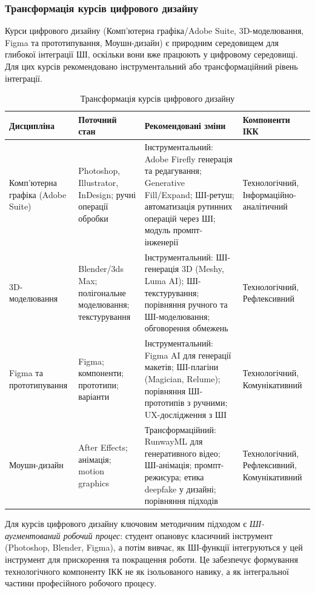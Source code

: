 \subsubsection{Трансформація курсів цифрового дизайну}\label{sssec:3.2.3}

Курси цифрового дизайну (Комп'ютерна графіка/Adobe Suite, 3D-моделювання, Figma та прототипування, Моушн-дизайн) є природним середовищем для глибокої інтеграції ШІ, оскільки вони вже працюють у цифровому середовищі. Для цих курсів рекомендовано інструментальний або трансформаційний рівень інтеграції.

\begin{table}[htbp]
\centering
\caption{Трансформація курсів цифрового дизайну}\label{tab:digital-transform}
\small
\begin{tabularx}{\textwidth}{@{}p{}p{}p{}p{}@{}}
\toprule
\textbf{Дисципліна} & \textbf{Поточний стан} & \textbf{Рекомендовані зміни} & \textbf{Компоненти ІКК} \\
\midrule
Комп'ютерна графіка (Adobe Suite) & Photoshop, Illustrator, InDesign; ручні операції обробки & Інструментальний: Adobe Firefly генерація та редагування; Generative Fill/Expand; ШІ-ретуш; автоматизація рутинних операцій через ШІ; модуль промпт-інженерії & Технологічний, Інформаційно-аналітичний \\
\addlinespace
3D-моделювання & Blender/3ds Max; полігональне моделювання; текстурування & Інструментальний: ШІ-генерація 3D (Meshy, Luma AI); ШІ-текстурування; порівняння ручного та ШІ-моделювання; обговорення обмежень & Технологічний, Рефлексивний \\
\addlinespace
Figma та прототипування & Figma; компоненти; прототипи; варіанти & Інструментальний: Figma AI для генерації макетів; ШІ-плагіни (Magician, Relume); порівняння ШІ-прототипів з ручними; UX-дослідження з ШІ & Технологічний, Комунікативний \\
\addlinespace
Моушн-дизайн & After Effects; анімація; motion graphics & Трансформаційний: RunwayML для генеративного відео; ШІ-анімація; промпт-режисура; етика deepfake у дизайні; порівняння підходів & Технологічний, Рефлексивний, Комунікативний \\
\bottomrule
\end{tabularx}
\end{table}

Для курсів цифрового дизайну ключовим методичним підходом є \textit{ШІ-аугментований робочий процес}: студент опановує класичний інструмент (Photoshop, Blender, Figma), а потім вивчає, як ШІ-функції інтегруються у цей інструмент для прискорення та покращення роботи. Це забезпечує формування технологічного компоненту ІКК не як ізольованого навику, а як інтегральної частини професійного робочого процесу.

